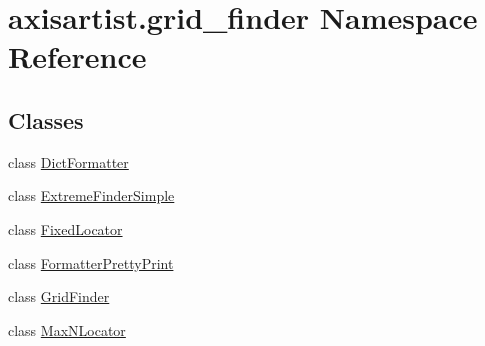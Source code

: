 \hypertarget{namespaceaxisartist_1_1grid__finder}{}\section{axisartist.\+grid\+\_\+finder Namespace Reference}
\label{namespaceaxisartist_1_1grid__finder}
\subsection*{Classes}
\begin{DoxyCompactItemize}
\item 
class \hyperlink{classaxisartist_1_1grid__finder_1_1DictFormatter}{Dict\+Formatter}
\item 
class \hyperlink{classaxisartist_1_1grid__finder_1_1ExtremeFinderSimple}{Extreme\+Finder\+Simple}
\item 
class \hyperlink{classaxisartist_1_1grid__finder_1_1FixedLocator}{Fixed\+Locator}
\item 
class \hyperlink{classaxisartist_1_1grid__finder_1_1FormatterPrettyPrint}{Formatter\+Pretty\+Print}
\item 
class \hyperlink{classaxisartist_1_1grid__finder_1_1GridFinder}{Grid\+Finder}
\item 
class \hyperlink{classaxisartist_1_1grid__finder_1_1MaxNLocator}{Max\+N\+Locator}
\end{DoxyCompactItemize}
